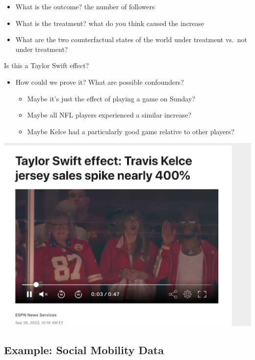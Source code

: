 \documentclass[
  letterpaper,
  DIV=11,
  numbers=noendperiod]{scrreprt}
\providecommand{\tightlist}{%
  \setlength{\itemsep}{0pt}\setlength{\parskip}{0pt}}\usepackage{longtable,booktabs,array}
\begin{document}
\begin{itemize}
\tightlist
\item
  What is the outcome? the number of followers
\item
  What is the treatment? what do you think caused the increase
\item
  What are the two counterfactual states of the world under treatment
  vs.~not under treatment?
\end{itemize}

Is this a Taylor Swift effect?

\begin{itemize}
\tightlist
\item
  How could we prove it? What are possible confounders?

  \begin{itemize}
  \tightlist
  \item
    Maybe it's just the effect of playing a game on Sunday?
  \item
    Maybe all NFL players experienced a similar increase?
  \item
    Maybe Kelce had a particularly good game relative to other players?
  \end{itemize}
\end{itemize}

\includegraphics{images/kelce.png}

\hypertarget{example-social-mobility-data}{%
\subsection{Example: Social Mobility
Data}\label{example-social-mobility-data}}
\end{document}

